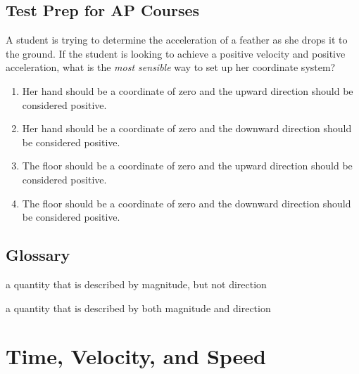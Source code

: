 \documentclass[
]{book}
\providecommand{\tightlist}{%
  \setlength{\itemsep}{0pt}\setlength{\parskip}{0pt}}
\newenvironment{ap-test-prep}{}{}
\begin{document}
\hypertarget{fs-id1368980}{}
\begin{ap-test-prep}

\hypertarget{test-prep-for-ap-courses-1}{%
\subsection{Test Prep for AP Courses}\label{test-prep-for-ap-courses-1}}

\hypertarget{fs-id1890618}{}
\leavevmode\hypertarget{fs-id1408528}{}%
A student is trying to determine the acceleration of a feather as she
drops it to the ground. If the student is looking to achieve a positive
velocity and positive acceleration, what is the \emph{most sensible} way to
set up her coordinate system?

\begin{enumerate}
\def\labelenumi{\alph{enumi}.}
\tightlist
\item
  Her hand should be a coordinate of zero and the upward direction
  should be considered positive.
\item
  Her hand should be a coordinate of zero and the downward direction
  should be considered positive.
\item
  The floor should be a coordinate of zero and the upward direction
  should be considered positive.
\item
  The floor should be a coordinate of zero and the downward direction
  should be considered positive.
\end{enumerate}

\end{ap-test-prep}

\hypertarget{glossary-1}{%
\subsection{Glossary}\label{glossary-1}}

\begin{description}
\tightlist
\item[scalar]
a quantity that is described by magnitude, but not direction
\end{description}

\begin{description}
\tightlist
\item[vector]
a quantity that is described by both magnitude and direction
\end{description}

\hypertarget{time-velocity-and-speed}{%
\section{Time, Velocity, and Speed}\label{time-velocity-and-speed}}
\end{document}
